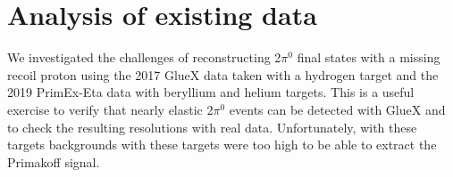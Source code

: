 
\section{Analysis of existing data}
We investigated the challenges of reconstructing 2$\pi^0$ final states
with a missing recoil proton using the 2017 GlueX data taken with a
hydrogen target and the 2019 PrimEx-Eta data with beryllium and helium targets.
This is a useful exercise to verify that nearly elastic 2$\pi^0$
events can be detected with GlueX and to check the resulting
resolutions with real data. Unfortunately, with these targets
backgrounds with these targets were too high to be able to extract the
Primakoff signal.
